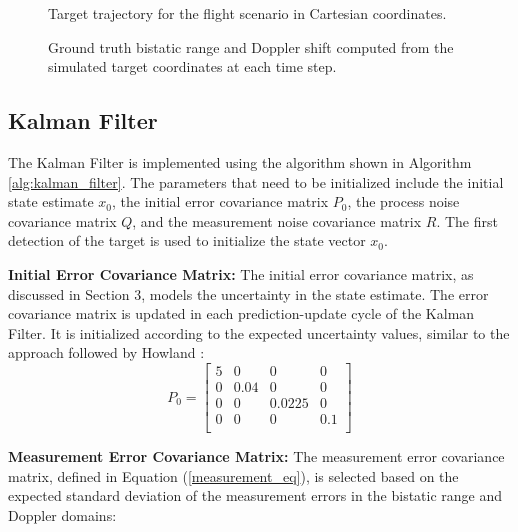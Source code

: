 \begin{figure}[H]
    \centering
    
    \caption{Target trajectory for the flight scenario in Cartesian 
    coordinates.}
    \label{fig:targetpath2}
\end{figure}

\begin{figure}[H]
    \centering
    
    \caption{Ground truth bistatic range and Doppler shift computed from 
    the simulated target coordinates at each time step.}
    \label{fig:groundtruth2}
\end{figure}%
\subsection{Kalman Filter}
The Kalman Filter is implemented using the algorithm shown in Algorithm \ref{alg:kalman_filter}. The parameters that need to be initialized include the initial state estimate \(x_0\), the initial error covariance matrix \(P_0\), the process noise covariance matrix \(Q\), and the measurement noise covariance matrix \(R\). The first detection of the target is used to initialize the state vector \(x_0\).

\textbf{Initial Error Covariance Matrix:}
\newline
The initial error covariance matrix, as discussed in Section 3, models the uncertainty in the state estimate. The error covariance matrix is updated in each prediction-update cycle of the Kalman Filter. It is initialized according to the expected uncertainty values, similar to the approach followed by Howland \cite{Howland2005a}:
\begin{equation}
    P_0 = \begin{bmatrix}
        5 & 0 & 0 & 0 \\
        0 & 0.04 & 0 & 0 \\
        0 & 0 & 0.0225 & 0 \\
        0 & 0 & 0 & 0.1 \\
    \end{bmatrix}
\end{equation}


\textbf{Measurement Error Covariance Matrix:}
\newline
The measurement error covariance matrix, defined in Equation (\ref{measurement_eq}), is selected based on the expected standard deviation of the measurement errors in the bistatic range and Doppler domains:

